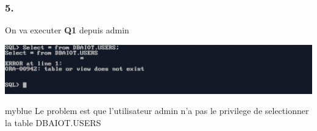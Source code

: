\subsubsection*{5.}
On va executer \textbf{Q1} depuis admin



\begin{center}
    \includegraphics[width=\textwidth]{ScreenShot/Partie4/select.png}
\end{center}

\begin{prettyBox}{}{myblue}
Le problem est que l'utilisateur admin n'a pas le privilege de selectionner la table DBAIOT.USERS 
\end{prettyBox}


